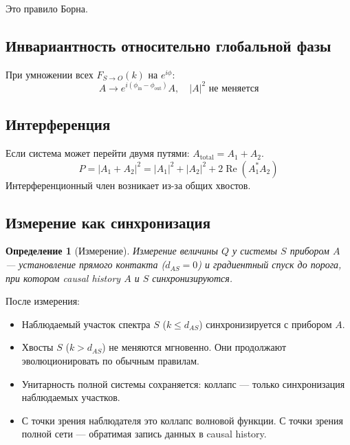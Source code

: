\documentclass[11pt,a4paper]{article}
\newtheorem{definition}{Определение}[section]
\theoremstyle{definition}
\begin{document}
Это правило Борна.

\subsection{Инвариантность относительно глобальной фазы}

При умножении всех $F_{S \to O}(k)$ на $e^{i\phi}$:
\begin{equation}
    A \to e^{i(\phi_{\text{in}} - \phi_{\text{out}})} A, \quad |A|^2 \text{ не меняется}
\end{equation}

\subsection{Интерференция}

Если система может перейти двумя путями: $A_{\text{total}} = A_1 + A_2$.
\begin{equation}
    P = |A_1 + A_2|^2 = |A_1|^2 + |A_2|^2 + 2 \operatorname{Re}(A_1^* A_2)
\end{equation}
Интерференционный член возникает из-за общих хвостов.

\subsection{Измерение как синхронизация}

\begin{definition}[Измерение]
Измерение величины $Q$ у системы $S$ прибором $A$ --- установление прямого контакта ($d_{AS} = 0$) и градиентный спуск до порога, при котором causal history $A$ и $S$ синхронизируются.
\end{definition}

После измерения:
\begin{itemize}
    \item Наблюдаемый участок спектра $S$ ($k \leq d_{AS}$) синхронизируется с прибором $A$.
    \item Хвосты $S$ ($k > d_{AS}$) не меняются мгновенно. Они продолжают эволюционировать по обычным правилам.
    \item Унитарность полной системы сохраняется: коллапс --- только синхронизация наблюдаемых участков.
    \item С точки зрения наблюдателя это коллапс волновой функции. С точки зрения полной сети --- обратимая запись данных в causal history.
\end{itemize}

\newpage
\end{document}
